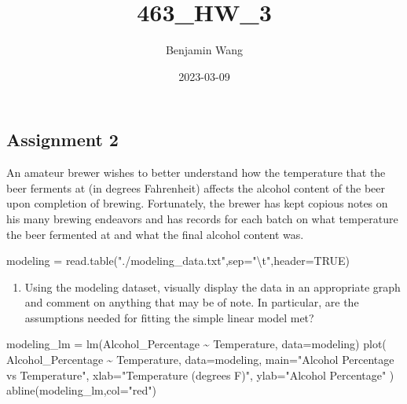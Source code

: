 \documentclass[
]{article}
\title{463\_HW\_3}
\author{Benjamin Wang}
\date{2023-03-09}
\newenvironment{Shaded}{\begin{snugshade}}{\end{snugshade}}
\newcommand{\AttributeTok}[1]{\textcolor[rgb]{0.77,0.63,0.00}{#1}}
\newcommand{\ConstantTok}[1]{\textcolor[rgb]{0.00,0.00,0.00}{#1}}
\newcommand{\FunctionTok}[1]{\textcolor[rgb]{0.00,0.00,0.00}{#1}}
\newcommand{\NormalTok}[1]{#1}
\newcommand{\OtherTok}[1]{\textcolor[rgb]{0.56,0.35,0.01}{#1}}
\newcommand{\SpecialCharTok}[1]{\textcolor[rgb]{0.00,0.00,0.00}{#1}}
\newcommand{\StringTok}[1]{\textcolor[rgb]{0.31,0.60,0.02}{#1}}
\providecommand{\tightlist}{%
  \setlength{\itemsep}{0pt}\setlength{\parskip}{0pt}}
\begin{document}
\maketitle

\hypertarget{assignment-2}{%
\subsection{Assignment 2}\label{assignment-2}}

An amateur brewer wishes to better understand how the temperature that
the beer ferments at (in degrees Fahrenheit) affects the alcohol content
of the beer upon completion of brewing. Fortunately, the brewer has kept
copious notes on his many brewing endeavors and has records for each
batch on what temperature the beer fermented at and what the final
alcohol content was.

\begin{Shaded}
\begin{Highlighting}[]
\NormalTok{modeling }\OtherTok{=} \FunctionTok{read.table}\NormalTok{(}\StringTok{"./modeling\_data.txt"}\NormalTok{,}\AttributeTok{sep=}\StringTok{"}\SpecialCharTok{\textbackslash{}t}\StringTok{"}\NormalTok{,}\AttributeTok{header=}\ConstantTok{TRUE}\NormalTok{)}
\end{Highlighting}
\end{Shaded}

\begin{enumerate}
\def\labelenumi{\arabic{enumi})}
\tightlist
\item
  Using the modeling dataset, visually display the data in an
  appropriate graph and comment on anything that may be of note. In
  particular, are the assumptions needed for fitting the simple linear
  model met?
\end{enumerate}

\begin{Shaded}
\begin{Highlighting}[]
\NormalTok{modeling\_lm }\OtherTok{=} \FunctionTok{lm}\NormalTok{(Alcohol\_Percentage }\SpecialCharTok{\textasciitilde{}}\NormalTok{ Temperature, }\AttributeTok{data=}\NormalTok{modeling)}
\FunctionTok{plot}\NormalTok{(}
\NormalTok{  Alcohol\_Percentage }\SpecialCharTok{\textasciitilde{}}\NormalTok{ Temperature, }\AttributeTok{data=}\NormalTok{modeling,}
  \AttributeTok{main=}\StringTok{"Alcohol Percentage vs Temperature"}\NormalTok{,}
  \AttributeTok{xlab=}\StringTok{"Temperature (degrees F)"}\NormalTok{,}
  \AttributeTok{ylab=}\StringTok{"Alcohol Percentage"}
\NormalTok{)}
\FunctionTok{abline}\NormalTok{(modeling\_lm,}\AttributeTok{col=}\StringTok{"red"}\NormalTok{)}
\end{Highlighting}
\end{Shaded}
\end{document}
